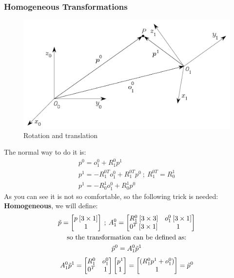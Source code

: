 \documentclass{article}
\begin{document}
    \subsubsection{Homogeneous Transformations}
    \begin{figure}[h!]
    \centering
    \includegraphics[scale=0.9]{homogenTr.png}
    \caption{Rotation and translation}
    \label{fig:sr}
    \end{figure}
    The normal way to do it is:
    \begin{gather*}
        p^0 = o^0_1+R^0_1p^1\\
        p^1 = -R^{0T}_1o^0_1+R^{0T}_1p^0 \:;\: R^{0T}_1 = R^1_0\\
        p^1 = -R^1_0o^0_1+R^1_0p^0
    \end{gather*}
    As you can see it is not so comfortable, so the following trick is needed:\\
    \textbf{Homogeneous}, we will define:
    \begin{gather*}
        \Tilde{p} = \begin{bmatrix}
        p\:[3\times1]\\ 1
        \end{bmatrix} \:;\:
        A^0_1 = \begin{bmatrix}
        R^0_1\:[3\times3] & o^0_1\:[3\times1] \\
        0^T \: [3\times1] & 1
        \end{bmatrix}\\
        \textrm{so the transformation can be defined as:}\\
        \Tilde{p}^0= A^0_1\Tilde{p}^1
    \end{gather*}
    \begin{gather*}
        A^0_1\Tilde{p}^1 = \begin{bmatrix}
        R^0_1 & o^0_1 \\
        0^T &1
        \end{bmatrix}
        \begin{bmatrix}
        p^1 \\ 1
        \end{bmatrix} = 
        \begin{bmatrix}
        (R^0_1p^1+o^0_1) \\ 
        1
        \end{bmatrix} = \Tilde{p}^0
    \end{gather*}
\end{document}
